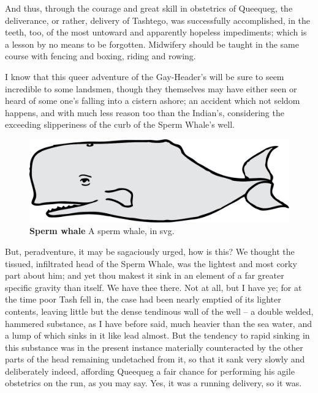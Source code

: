 \documentclass{article}
\begin{document}
   And thus, through the courage and great skill in obstetrics of Queequeg, the deliverance, or rather, delivery of Tashtego, was successfully accomplished, in the teeth, too, of the most untoward and apparently hopeless impediments; which is a lesson by no means to be forgotten. Midwifery should be taught in the same course with fencing and boxing, riding and rowing.

   I know that this queer adventure of the Gay-Header's will be sure to seem incredible to some landsmen, though they themselves may have either seen or heard of some one's falling into a cistern ashore; an accident which not seldom happens, and with much less reason too than the Indian's, considering the exceeding slipperiness of the curb of the Sperm Whale's well.

\begin{figure}[!htp]
  \begin{center}
      \includegraphics{whale-8546-svg}
    \caption{
        \textbf{Sperm whale}
        A sperm whale, in svg.
    }
  \end{center}
\end{figure}

   But, peradventure, it may be sagaciously urged, how is this? We thought the tissued, infiltrated head of the Sperm Whale, was the lightest and most corky part about him; and yet thou makest it sink in an element of a far greater specific gravity than itself. We have thee there. Not at all, but I have ye; for at the time poor Tash fell in, the case had been nearly emptied of its lighter contents, leaving little but the dense tendinous wall of the well -- a double welded, hammered substance, as I have before said, much heavier than the sea water, and a lump of which sinks in it like lead almost. But the tendency to rapid sinking in this substance was in the present instance materially counteracted by the other parts of the head remaining undetached from it, so that it sank very slowly and deliberately indeed, affording Queequeg a fair chance for performing his agile 
   obstetrics on the run, as you may say. Yes, it was a running delivery, so it was.
\end{document}
